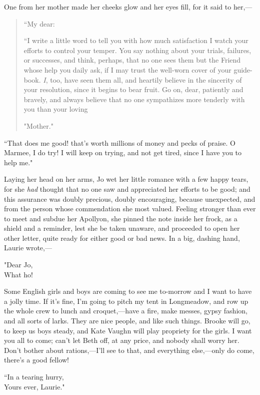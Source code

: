 One from her mother made her cheeks glow and her eyes fill, for it said
to her,---

\begin{quote}
``My dear:

``I write a little word to tell you with how much satisfaction I watch
your efforts to control your temper. You say nothing about your trials,
failures, or successes, and think, perhaps, that no one sees them but
the Friend whose help you daily ask, if I may trust the well-worn cover
of your guide-book. \emph{I}, too, have seen them all, and heartily
believe in the sincerity of your resolution, since it begins to bear
fruit. Go on, dear, patiently and bravely, and always believe that no
one sympathizes more tenderly with you than your loving

"{Mother.}"
\end{quote}

``That does me good! that's worth millions of money and
pecks of praise. O Marmee, I do try! I will keep on trying, and not get
tired, since I have you to help me."

Laying her head on her arms, Jo wet her little romance with a few happy
tears, for she \emph{had} thought that no one saw and appreciated her
efforts to be good; and this assurance was doubly precious, doubly
encouraging, because unexpected, and from the person whose commendation
she most valued. Feeling stronger than ever to meet and subdue her
Apollyon, she pinned the note inside her frock, as a shield and a
reminder, lest she be taken unaware, and proceeded to open her other
letter, quite ready for either good or bad news. In a big, dashing hand,
Laurie wrote,---

"{Dear Jo},\\
What ho!

Some English girls and boys are coming to see me to-morrow and I want to
have a jolly time. If it's fine, I'm
going to pitch my tent in Longmeadow, and row up the whole crew to lunch
and croquet,---have a fire, make messes, gypsy fashion, and all sorts of
larks. They are nice people, and like such things. Brooke will go, to
keep us boys steady, and Kate Vaughn will play propriety for the girls.
I want you all to come; can't let Beth off, at any
price, and nobody shall worry her. Don't bother about
rations,---I'll see to that, and everything else,---only
do come, there's a good fellow!

``In a tearing hurry,\\
Yours ever, {Laurie}."

